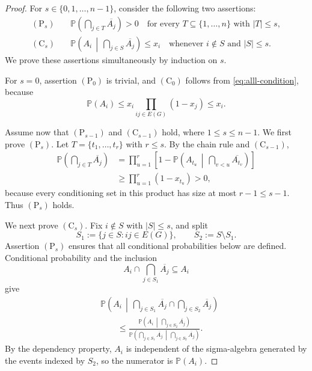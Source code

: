 \documentclass[11pt]{article}
\theoremstyle{definition}
\theoremstyle{remark}
\begin{document}
\begin{proof}
For $s\in\{0,1,\ldots,n-1\}$, consider the following two assertions:
\begin{align*}
(\mathrm P_s)\quad&
\mathbb P\left(\bigcap_{j\in T}\overline{A_j}\right)>0
\quad\text{for every }T\subseteq\{1,\ldots,n\}\text{ with }|T|\le s,\\
(\mathrm C_s)\quad&
\mathbb P\left(A_i\,\middle|\,\bigcap_{j\in S}\overline{A_j}\right)\le x_i
\quad\text{whenever }i\notin S\text{ and }|S|\le s.
\end{align*}
We prove these assertions simultaneously by induction on $s$.

For $s=0$, assertion $(\mathrm P_0)$ is trivial, and $(\mathrm C_0)$ follows from \eqref{eq:alll-condition}, because
\[
\mathbb P(A_i)\le x_i\prod_{ij\in E(G)}(1-x_j)\le x_i.
\]

Assume now that $(\mathrm P_{s-1})$ and $(\mathrm C_{s-1})$ hold, where $1\le s\le n-1$. We first prove $(\mathrm P_s)$. Let $T=\{t_1,\ldots,t_r\}$ with $r\le s$. By the chain rule and $(\mathrm C_{s-1})$,
\begin{align*}
\mathbb P\left(\bigcap_{j\in T}\overline{A_j}\right)
&=\prod_{u=1}^{r}
\left[
1-\mathbb P\left(A_{t_u}\,\middle|\,
\bigcap_{v<u}\overline{A_{t_v}}
\right)
\right]\\
&\ge\prod_{u=1}^{r}(1-x_{t_u})>0,
\end{align*}
because every conditioning set in this product has size at most $r-1\le s-1$. Thus $(\mathrm P_s)$ holds.

We next prove $(\mathrm C_s)$. Fix $i\notin S$ with $|S|\le s$, and split
\[
S_1:=\{j\in S:ij\in E(G)\},
\qquad
S_2:=S\setminus S_1.
\]
Assertion $(\mathrm P_s)$ ensures that all conditional probabilities below are defined. Conditional probability and the inclusion
\[
A_i\cap\bigcap_{j\in S_1}\overline{A_j}\subseteq A_i
\]
give
\begin{align*}
&\mathbb P\left(A_i\,\middle|\,
\bigcap_{j\in S_1}\overline{A_j}\cap
\bigcap_{j\in S_2}\overline{A_j}\right)\\
&\qquad\le
\frac{
\mathbb P\left(A_i\,\middle|\,\bigcap_{j\in S_2}\overline{A_j}\right)
}{
\mathbb P\left(\bigcap_{j\in S_1}\overline{A_j}\,\middle|\,
\bigcap_{j\in S_2}\overline{A_j}\right)
}.
\end{align*}
By the dependency property, $A_i$ is independent of the sigma-algebra generated by the events indexed by $S_2$, so the numerator is $\mathbb P(A_i)$.


\end{proof}
\end{document}
